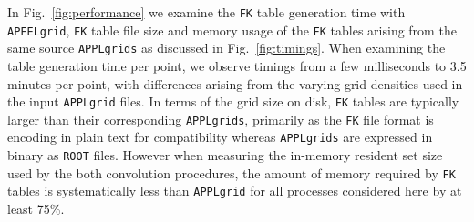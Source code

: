\documentclass[preprint,12pt]{elsarticle}
\begin{document}
In Fig.~\ref{fig:performance} we examine the {\tt FK} table generation
time with {\tt APFELgrid}, {\tt FK} table file size and memory usage
of the {\tt FK} tables arising from the same source {\tt APPLgrids} as
discussed in Fig.~\ref{fig:timings}.  When examining the table
generation time per point, we observe timings from a few milliseconds
to 3.5 minutes per point, with differences arising from the varying
grid densities used in the input {\tt APPLgrid} files.  In terms of
the grid size on disk, {\tt FK} tables are typically larger than their
corresponding {\tt APPLgrids}, primarily as the {\tt FK} file format
is encoding in plain text for compatibility whereas {\tt APPLgrids}
are expressed in binary as {\tt ROOT} files. However when measuring
the in-memory resident set size used by the both convolution
procedures, the amount of memory required by {\tt FK} tables is
systematically less than {\tt APPLgrid} for all processes considered
here by at least 75\%.

\end{document}
